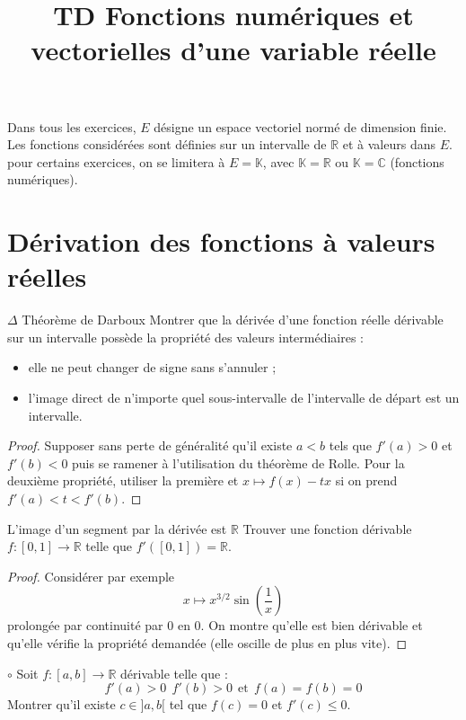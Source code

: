 \documentclass[french,a4paper]{article}
\title{TD Fonctions numériques et vectorielles d'une variable réelle}
\newcommand{\R}{\mathbb{R}}
\newcommand{\C}{\mathbb{C}}
\newcommand{\K}{\mathbb{K}}
\theoremstyle{plain}
\theoremstyle{definition}
\theoremstyle{remark}
\begin{document}
\maketitle

Dans tous les exercices, $E$ désigne un espace vectoriel normé de dimension finie. Les fonctions considérées sont définies sur un intervalle de $\R$ et à valeurs dans $E$. pour certains exercices, on se limitera à $E=\K$, avec $\K=\R$ ou $\K=\C$ (fonctions numériques).
\section{Dérivation des fonctions à valeurs réelles}

\begin{ex}[Moulin.FV.01]{$\Delta$ Théorème de Darboux}
	Montrer que la dérivée d'une fonction réelle dérivable sur un intervalle possède la propriété des valeurs intermédiaires :
	\begin{itemize}
		\item elle ne peut changer de signe sans s'annuler ;
		\item l'image direct de n'importe quel sous-intervalle de l'intervalle de départ est un intervalle.
	\end{itemize}
\end{ex}
\begin{proof}
	Supposer sans perte de généralité qu'il existe $a<b$ tels que $f'(a)>0$ et $f'(b)<0$ puis se ramener à l'utilisation du théorème de Rolle. Pour la deuxième propriété, utiliser la première et $x\mapsto f(x)-tx$ si on prend $f'(a)<t<f'(b)$.
\end{proof}

\begin{ex}[Moulin.FV.02]{L'image d'un segment par la dérivée est $\R$}
	Trouver une fonction dérivable $f:[0,1]\to\R$ telle que $f'([0,1])=\R$.
\end{ex}
\begin{proof}
	Considérer par exemple $$x\mapsto x^{3/2}\sin\left(\frac{1}{x}\right)$$ prolongée par continuité par $0$ en $0$. On montre qu'elle est bien dérivable et qu'elle vérifie la propriété demandée (elle oscille de plus en plus vite).
\end{proof}

\begin{ex}[Moulin.FV.03]{$\circ$}
	Soit $f:[a,b]\to\R$ dérivable telle que : $$f'(a)>0\ \ f'(b)>0\ \ \text{et}\ \ f(a)=f(b)=0$$ Montrer qu'il existe $c\in]a,b[$ tel que $f(c)=0$ et $f'(c)\leqslant 0$.
\end{ex}
\end{document}
